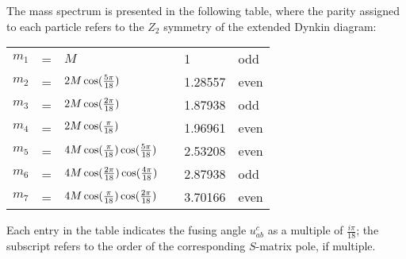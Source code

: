 \documentclass[a4paper,12pt]{report}
\begin{document}
\vspace{0.5cm}

The mass spectrum is presented in the following table, where the parity assigned to each particle refers to the
$Z_{2}$ symmetry of the extended Dynkin diagram:

\vspace{0.5cm}

\begin{center}
\begin{tabular}{|cclc|l|l|} \hline
$m_1$ &=& $M$ & & 1  & \hspace{1mm} odd \\
$m_2$ &=& $2 M \cos({5\pi \over 18})$ & & 1.28557 & \hspace{1mm} even \\
$m_3$ &=& $2 M \cos({2\pi \over 18})$ & & 1.87938 & \hspace{1mm} odd \\
$m_4$ &=& $2 M \cos({\pi \over 18})$ & & 1.96961 & \hspace{1mm} even \\
$m_5$ &=& $4 M \cos({\pi \over 18}) \cos({5\pi \over 18})$ & & 2.53208 &
\hspace{1mm} even \\
$m_6$ &=& $4 M \cos({2\pi\over 18})\cos({4\pi \over 18}) $ & & 2.87938 &
\hspace{1mm} odd \\
$m_7$ &=& $4 M \cos({\pi \over 18}) \cos({2\pi \over 18})$ & & 3.70166 &
\hspace{1mm} even\\
\hline
\end{tabular}
\end{center}

\vspace{0.5cm}

Each entry in the table indicates the fusing angle $u_{ab}^{c}$ as a multiple of $\frac{i\pi}{18}$; the subscript
refers to the order of the corresponding $S$-matrix pole, if multiple.
\end{document}
